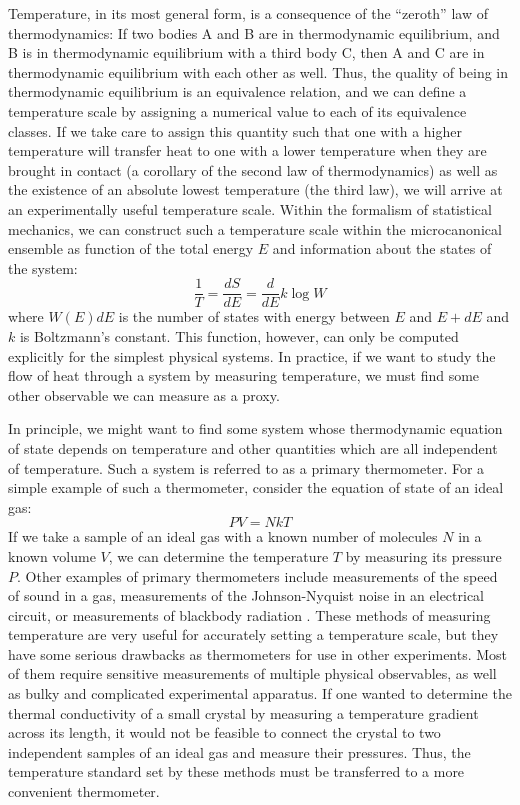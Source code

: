 \documentclass{thesis-umich}
\begin{document}
Temperature, in its most general form, is a consequence of the ``zeroth'' law
of thermodynamics: If two bodies A and B are in thermodynamic equilibrium, and
B is in thermodynamic equilibrium with a third body C, then A and C are in
thermodynamic equilibrium with each other as well. Thus, the quality of being
in thermodynamic equilibrium is an equivalence relation, and we can define a
temperature scale by assigning a numerical value to each of its equivalence
classes. If we take care to assign this quantity such that one with a higher
temperature will transfer heat to one with a lower temperature when they are
brought in contact (a corollary of the second law of thermodynamics) as well as
the existence of an absolute lowest temperature (the third law), we will arrive
at an experimentally useful temperature scale. Within the formalism of
statistical mechanics, we can construct  such a temperature scale within the
microcanonical ensemble as function of the total energy \(E\) and information
about the states of the system: \[\frac{1}{T} = \frac{dS}{dE} = \frac{d}{dE} k
\log W\] where \(W(E)dE\) is the number of states with energy between \(E\) and
\(E+dE\) and \(k\) is Boltzmann's constant. This function, however, can only be
computed explicitly for the simplest physical systems. In practice, if we want
to study the flow of heat through a system by measuring temperature, we must
find some other observable we can measure as a proxy.

In principle, we might want to find some system whose thermodynamic
equation of state depends on temperature and other quantities which are
all independent of temperature. Such a system is referred to as a primary
thermometer. For a simple example of such a thermometer, consider the
equation of state of an ideal gas: \[PV = NkT\] If we take a sample of
an ideal gas with a known number of molecules \(N\) in a known volume
\(V\), we can determine the temperature \(T\) by measuring its pressure
\(P\). Other examples of primary thermometers include measurements of
the speed of sound in a gas, measurements of the Johnson-Nyquist noise
in an electrical circuit, or measurements of blackbody radiation
\cite{Ekin2006}. These methods of measuring temperature are very useful
for accurately setting a temperature scale, but they have some serious
drawbacks as thermometers for use in other experiments. Most of them
require sensitive measurements of multiple physical observables, as well
as bulky and complicated experimental apparatus. If one wanted to
determine the thermal conductivity of a small crystal by measuring a
temperature gradient across its length, it would not be feasible to
connect the crystal to two independent samples of an ideal gas and
measure their pressures. Thus, the temperature standard set by these
methods must be transferred to a more convenient thermometer.
\end{document}
